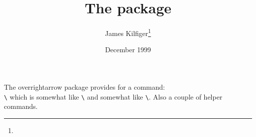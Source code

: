 \documentclass[pagesize=auto, fontsize=14pt, DIV=9, parskip=half]{scrartcl}
\title{The \pkg{overrightarrow} package}
\author{James Kilfiger\thanks{\mail{mapdn@csv.warwick.ac.uk}}}
\date{December 1999}
\makeatletter
\newcommand*{\pkg}[1]{\textsf{#1}}
\newcommand*{\cs}[1]{\texttt{\textbackslash#1}}
\newcommand*{\cmd}[1]{\cs{\expandafter\@gobble\string#1}}
\makeatother
\begin{document}
\maketitle

The \pkg{overrightarrow} package provides for a command:\\
\cmd{\Overrightarrow} which is somewhat like \cmd{\overrightarrow} and somewhat
like \cmd{\Rightarrow}.  Also a couple of helper commands.
\end{document}
